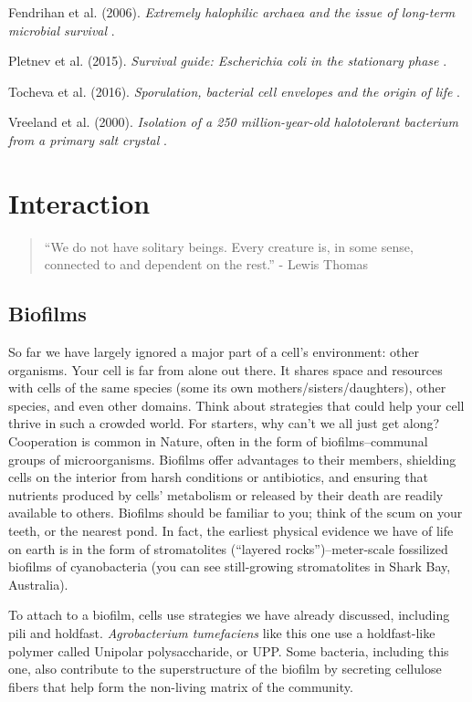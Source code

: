 \documentclass[]{tufte-book}
\begin{document}
Fendrihan et al. (2006). \emph{Extremely halophilic archaea and the issue of long-term microbial survival} \citep{fendrihan2006}.

Pletnev et al. (2015). \emph{Survival guide: Escherichia coli in the stationary phase} \citep{pletnev2015}.

Tocheva et al. (2016). \emph{Sporulation, bacterial cell envelopes and the origin of life} \citep{tocheva2016}.

Vreeland et al. (2000). \emph{Isolation of a 250 million-year-old halotolerant bacterium from a primary salt crystal} \citep{vreeland2000}.

\hypertarget{interaction}{%
\chapter{Interaction}\label{interaction}}

\begin{quote}
``We do not have solitary beings. Every creature is, in some sense, connected to and dependent on the rest.''
- Lewis Thomas \citep{thomas1974}
\end{quote}

\hypertarget{biofilms}{%
\section{Biofilms}\label{biofilms}}

So far we have largely ignored a major part of a cell's environment: other organisms. Your cell is far from alone out there. It shares space and resources with cells of the same species (some its own mothers/sisters/daughters), other species, and even other domains. Think about strategies that could help your cell thrive in such a crowded world. For starters, why can't we all just get along? Cooperation is common in Nature, often in the form of biofilms--communal groups of microorganisms. Biofilms offer advantages to their members, shielding cells on the interior from harsh conditions or antibiotics, and ensuring that nutrients produced by cells' metabolism or released by their death are readily available to others. Biofilms should be familiar to you; think of the scum on your teeth, or the nearest pond. In fact, the earliest physical evidence we have of life on earth is in the form of stromatolites (``layered rocks'')--meter-scale fossilized biofilms of cyanobacteria (you can see still-growing stromatolites in Shark Bay, Australia).

To attach to a biofilm, cells use strategies we have already discussed, including pili and holdfast. \emph{Agrobacterium tumefaciens} like this one use a holdfast-like polymer called Unipolar polysaccharide, or UPP. Some bacteria, including this one, also contribute to the superstructure of the biofilm by secreting cellulose fibers that help form the non-living matrix of the community.
\end{document}
